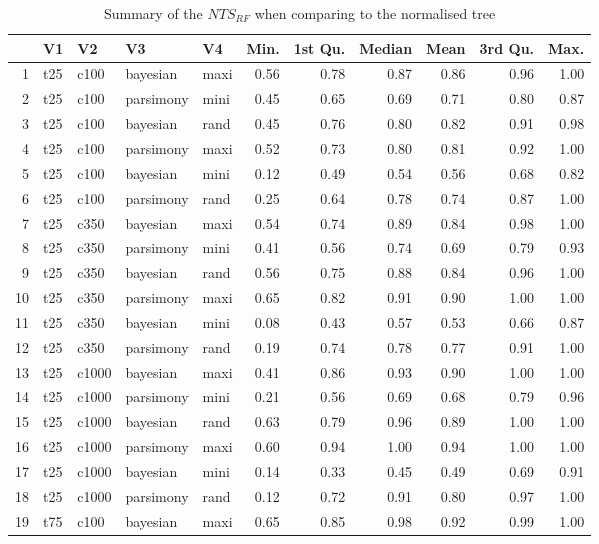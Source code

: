\documentclass[12pt,letterpaper]{article}
\begin{document}
\begin{longtable}{rllllrrrrrr}
\caption{Summary of the $NTS_{RF}$ when comparing to the normalised tree}\\

  \hline
 & V1 & V2 & V3 & V4 & Min. & 1st Qu. & Median & Mean & 3rd Qu. & Max. \\ 
  \hline
1 & t25 & c100 & bayesian & maxi & 0.56 & 0.78 & 0.87 & 0.86 & 0.96 & 1.00 \\ 
  2 & t25 & c100 & parsimony & mini & 0.45 & 0.65 & 0.69 & 0.71 & 0.80 & 0.87 \\ 
  3 & t25 & c100 & bayesian & rand & 0.45 & 0.76 & 0.80 & 0.82 & 0.91 & 0.98 \\ 
  4 & t25 & c100 & parsimony & maxi & 0.52 & 0.73 & 0.80 & 0.81 & 0.92 & 1.00 \\ 
  5 & t25 & c100 & bayesian & mini & 0.12 & 0.49 & 0.54 & 0.56 & 0.68 & 0.82 \\ 
  6 & t25 & c100 & parsimony & rand & 0.25 & 0.64 & 0.78 & 0.74 & 0.87 & 1.00 \\ 
  7 & t25 & c350 & bayesian & maxi & 0.54 & 0.74 & 0.89 & 0.84 & 0.98 & 1.00 \\ 
  8 & t25 & c350 & parsimony & mini & 0.41 & 0.56 & 0.74 & 0.69 & 0.79 & 0.93 \\ 
  9 & t25 & c350 & bayesian & rand & 0.56 & 0.75 & 0.88 & 0.84 & 0.96 & 1.00 \\ 
  10 & t25 & c350 & parsimony & maxi & 0.65 & 0.82 & 0.91 & 0.90 & 1.00 & 1.00 \\ 
  11 & t25 & c350 & bayesian & mini & 0.08 & 0.43 & 0.57 & 0.53 & 0.66 & 0.87 \\ 
  12 & t25 & c350 & parsimony & rand & 0.19 & 0.74 & 0.78 & 0.77 & 0.91 & 1.00 \\ 
  13 & t25 & c1000 & bayesian & maxi & 0.41 & 0.86 & 0.93 & 0.90 & 1.00 & 1.00 \\ 
  14 & t25 & c1000 & parsimony & mini & 0.21 & 0.56 & 0.69 & 0.68 & 0.79 & 0.96 \\ 
  15 & t25 & c1000 & bayesian & rand & 0.63 & 0.79 & 0.96 & 0.89 & 1.00 & 1.00 \\ 
  16 & t25 & c1000 & parsimony & maxi & 0.60 & 0.94 & 1.00 & 0.94 & 1.00 & 1.00 \\ 
  17 & t25 & c1000 & bayesian & mini & 0.14 & 0.33 & 0.45 & 0.49 & 0.69 & 0.91 \\ 
  18 & t25 & c1000 & parsimony & rand & 0.12 & 0.72 & 0.91 & 0.80 & 0.97 & 1.00 \\ 
  19 & t75 & c100 & bayesian & maxi & 0.65 & 0.85 & 0.98 & 0.92 & 0.99 & 1.00 \\ 

\end{longtable}
\end{document}
